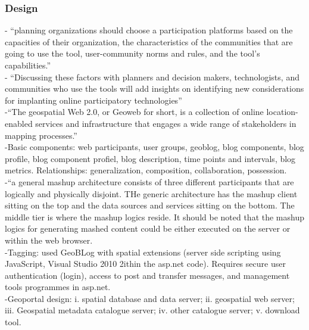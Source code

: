 \subsubsection{Design}
-{\color{orange} “planning organizations should choose a participation platforms based on the capacities of their organization, the characteristics of the communities that are going to use the tool, user-community norms and rules, and the tool’s capabilities.”}\cite{Afzalan2017}\\
-{\color{orange} “Discussing these factors with planners and decision makers, technologists, and communities who use the tools will add insights on identifying new considerations for implanting online participatory technologies”}\cite{Afzalan2017}\\
-{\color{orange}“The geospatial Web 2.0, or Geoweb for short, is a collection of online location-enabled services and infrastructure that engages a wide range of stakeholders in mapping processes.” }\cite{Xing2015}\\
-{\color{orange}Basic components: web participants, user groups, geoblog, blog components, blog profile, blog component profiel, blog description, time points and intervals, blog metrics. Relationships: generalization, composition, collaboration, possession.}\cite{Xing2015}\\
-{\color{orange}“a general mashup architecture consists of three different participants that are logically and physically disjoint. THe generic architecture has the mashup client sitting on the top and the data sources and services sitting on the bottom. The middle tier is where the mashup logics reside. It should be noted that the mashup logics for generating mashed content could be either executed on the server or within the web browser.}\cite{Xing2015}\\
-{\color{orange}Tagging: used GeoBLog with spatial extensions (server side scripting using JavaScript, Visual Studio 2010 2ithin the asp.net code).  Requires secure user authentication (login), access to post and transfer messages, and management tools programmes in asp.net.}\cite{Xing2015}\\
-{\color{orange}Geoportal design: i. spatial database and data server; ii. geospatial web server; iii. Geospatial metadata catalogue server; iv. other catalogue server; v. download tool.\cite{Jiang2020}}\\
